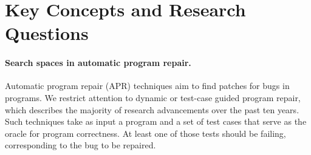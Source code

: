 \documentclass[sigconf, timestamp-false, anonymous=true]{acmart}
\begin{document}
\section{Key Concepts and Research Questions}
\label{sec:background}

\paragraph{Search spaces in automatic program repair.} Automatic program repair (APR) techniques aim to find patches for bugs in
programs.  We restrict attention to dynamic or test-case guided program repair,
which describes the majority of research advancements over the past ten years.
Such techniques take as input a program and a set of test cases that serve as
the oracle for program correctness.  At least one of those tests should be
failing, corresponding to the bug to be repaired.
\end{document}
